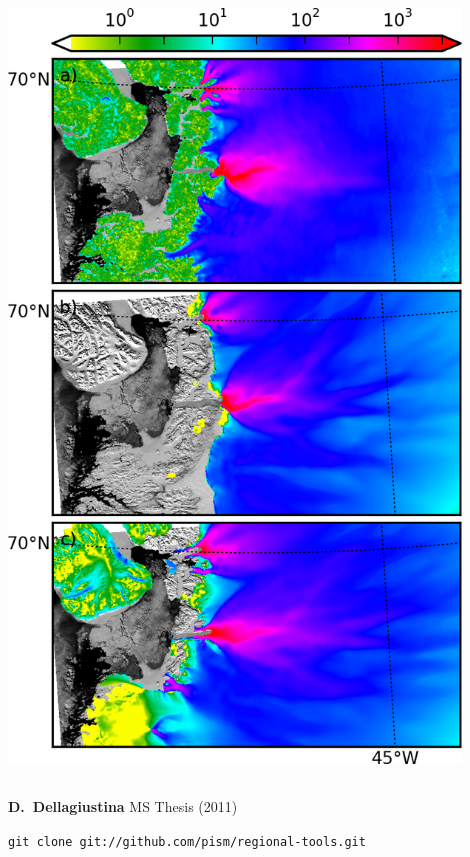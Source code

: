\documentclass[hide notes,intlimits]{beamer}
\begin{document}
\begin{frame}
\begin{columns}
\begin{column}{0.4\textwidth}
  \includegraphics[width=0.9\textwidth]{jako-grn1km}
\end{column}
\end{columns}

\begin{center}
\vspace{-2mm}

\tiny \textbf{D.~Dellagiustina} MS Thesis (2011)

\texttt{git clone git://github.com/pism/regional-tools.git}
\end{center}
\end{frame}
\end{document}
